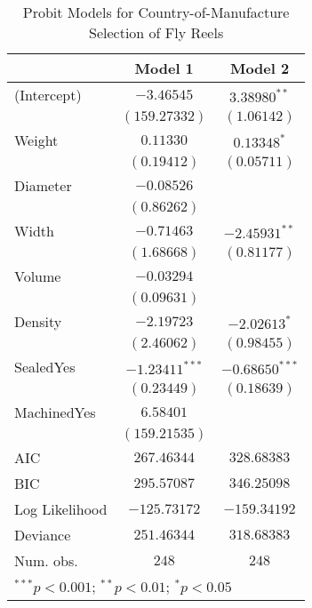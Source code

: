 
\begin{table}
\begin{center}
\begin{tabular}{l c c}
\hline
 & Model 1 & Model 2 \\
\hline
(Intercept)    & $-3.46545$       & $3.38980^{**}$   \\
               & $(159.27332)$    & $(1.06142)$      \\
Weight         & $0.11330$        & $0.13348^{*}$    \\
               & $(0.19412)$      & $(0.05711)$      \\
Diameter       & $-0.08526$       &                  \\
               & $(0.86262)$      &                  \\
Width          & $-0.71463$       & $-2.45931^{**}$  \\
               & $(1.68668)$      & $(0.81177)$      \\
Volume         & $-0.03294$       &                  \\
               & $(0.09631)$      &                  \\
Density        & $-2.19723$       & $-2.02613^{*}$   \\
               & $(2.46062)$      & $(0.98455)$      \\
SealedYes      & $-1.23411^{***}$ & $-0.68650^{***}$ \\
               & $(0.23449)$      & $(0.18639)$      \\
MachinedYes    & $6.58401$        &                  \\
               & $(159.21535)$    &                  \\
\hline
AIC            & $267.46344$      & $328.68383$      \\
BIC            & $295.57087$      & $346.25098$      \\
Log Likelihood & $-125.73172$     & $-159.34192$     \\
Deviance       & $251.46344$      & $318.68383$      \\
Num. obs.      & $248$            & $248$            \\
\hline
\multicolumn{3}{l}{\scriptsize{$^{***}p<0.001$; $^{**}p<0.01$; $^{*}p<0.05$}}
\end{tabular}
\caption{Probit Models for Country-of-Manufacture Selection of Fly Reels}
\label{tab:reg_probit}
\end{center}
\end{table}
